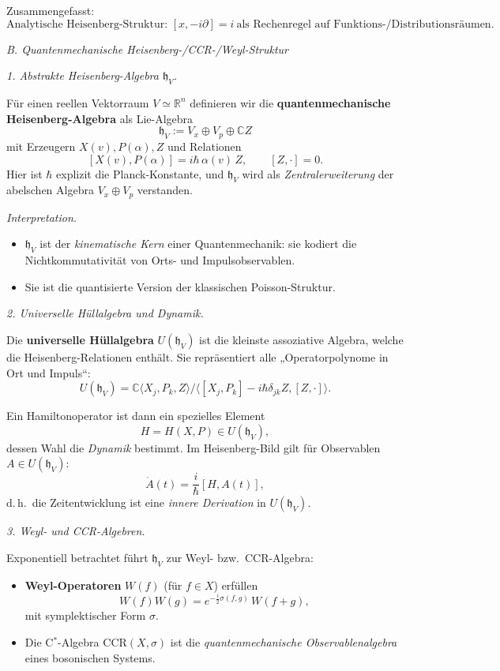 \documentclass[10pt, letterpaper]{article}
\newcommand{\R}{\mathbb{R}}
\newcommand{\C}{\mathbb{C}}
\begin{document}
Zusammengefasst:
\[
\boxed{
\text{Analytische Heisenberg-Struktur: } [x,-i\partial] = i\ \text{als Rechenregel auf Funktions-/Distributionsräumen.}
}
\]

\emph{B. Quantenmechanische Heisenberg-/CCR-/Weyl-Struktur}

\emph{1. Abstrakte Heisenberg-Algebra \(\mathfrak{h}_V\).}

Für einen reellen Vektorraum \(V\simeq\R^n\) definieren wir
die \textbf{quantenmechanische Heisenberg-Algebra} als Lie-Algebra
\[
\mathfrak{h}_V := V_x \oplus V_p \oplus \C Z
\]
mit Erzeugern \(X(v),P(\alpha),Z\) und Relationen
\[
[X(v),P(\alpha)] = i\hbar\,\alpha(v)\,Z,\qquad [Z,\cdot]=0.
\]
Hier ist \(\hbar\) explizit die Planck-Konstante,
und \(\mathfrak{h}_V\) wird als \emph{Zentralerweiterung} der abelschen Algebra
\(V_x\oplus V_p\) verstanden.

\emph{Interpretation.}
\begin{itemize}
  \item \(\mathfrak{h}_V\) ist der \emph{kinematische Kern} einer Quantenmechanik:
        sie kodiert die Nichtkommutativität von Orts- und Impulsobservablen.
  \item Sie ist die quantisierte Version der klassischen Poisson-Struktur.
\end{itemize}

\emph{2. Universelle Hüllalgebra und Dynamik.}

Die \textbf{universelle Hüllalgebra} \(U(\mathfrak{h}_V)\)
ist die kleinste assoziative Algebra, welche die Heisenberg-Relationen enthält.
Sie repräsentiert alle „Operatorpolynome in Ort und Impuls“:
\[
U(\mathfrak{h}_V)
= \C\langle X_j,P_k,Z\rangle / \langle [X_j,P_k]-i\hbar\delta_{jk}Z,[Z,\cdot]\rangle.
\]

Ein Hamiltonoperator ist dann ein spezielles Element
\[
H = H(X,P) \in U(\mathfrak{h}_V),
\]
dessen Wahl die \emph{Dynamik} bestimmt.  
Im Heisenberg-Bild gilt für Observablen \(A\in U(\mathfrak{h}_V)\):
\[
\dot{A}(t) = \frac{i}{\hbar}[H,A(t)],
\]
d.\,h.\ die Zeitentwicklung ist eine \emph{innere Derivation} in \(U(\mathfrak{h}_V)\).

\emph{3. Weyl- und CCR-Algebren.}

Exponentiell betrachtet führt \(\mathfrak{h}_V\) zur Weyl- bzw.\ CCR-Algebra:
\begin{itemize}
  \item \textbf{Weyl-Operatoren} \(W(f)\) (für \(f\in X\)) erfüllen
        \[
        W(f)W(g)=e^{-\frac{i}{2}\sigma(f,g)}\,W(f+g),
        \]
        mit symplektischer Form \(\sigma\).
  \item Die C$^\ast$-Algebra \(\mathrm{CCR}(X,\sigma)\) ist die \emph{quantenmechanische Observablenalgebra}
        eines bosonischen Systems.
\end{itemize}
\end{document}
